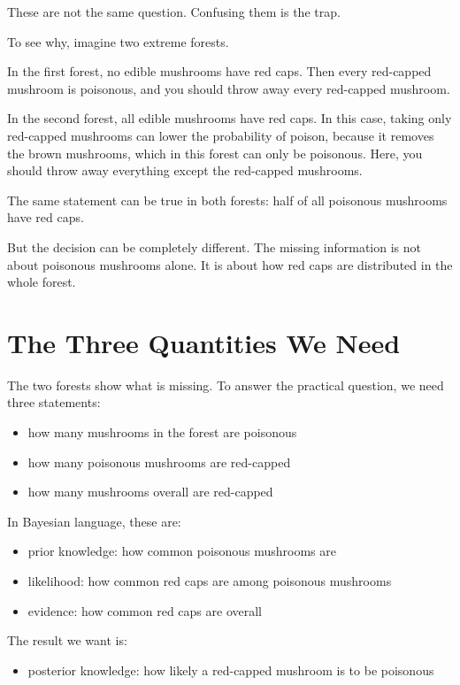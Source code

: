 \documentclass[11pt]{article}
\begin{document}
These are not the same question. Confusing them is the trap.

To see why, imagine two extreme forests.

In the first forest, no edible mushrooms have red caps. Then every red-capped mushroom is poisonous, and you should throw away every red-capped mushroom.

In the second forest, all edible mushrooms have red caps. In this case, taking only red-capped mushrooms can lower the probability of poison, because it removes the brown mushrooms, which in this forest can only be poisonous. Here, you should throw away everything except the red-capped mushrooms.

The same statement can be true in both forests: half of all poisonous mushrooms have red caps.

But the decision can be completely different. The missing information is not about poisonous mushrooms alone. It is about how red caps are distributed in the whole forest.

\section*{The Three Quantities We Need}

The two forests show what is missing. To answer the practical question, we need three statements:

\begin{itemize}
  \item how many mushrooms in the forest are poisonous
  \item how many poisonous mushrooms are red-capped
  \item how many mushrooms overall are red-capped
\end{itemize}

In Bayesian language, these are:

\begin{itemize}
  \item prior knowledge: how common poisonous mushrooms are
  \item likelihood: how common red caps are among poisonous mushrooms
  \item evidence: how common red caps are overall
\end{itemize}

The result we want is:

\begin{itemize}
  \item posterior knowledge: how likely a red-capped mushroom is to be poisonous
\end{itemize}
\end{document}
